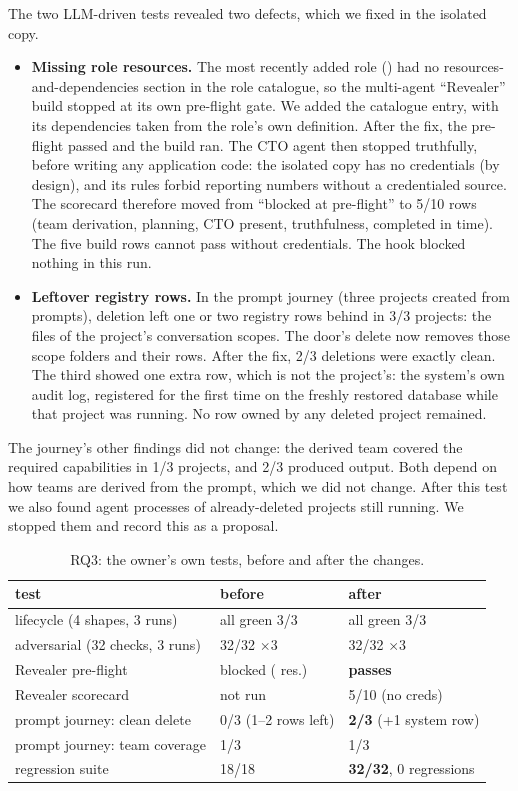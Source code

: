 The two LLM-driven tests revealed two defects, which we fixed in the isolated copy.
\begin{itemize}
\item \textbf{Missing role resources.} The most recently added role (\newrole{}) had no resources-and-dependencies section in the role catalogue, so the multi-agent ``Revealer'' build stopped at its own pre-flight gate. We added the catalogue entry, with its dependencies taken from the role's own definition. After the fix, the pre-flight passed and the build ran. The CTO agent then stopped truthfully, before writing any application code: the isolated copy has no credentials (by design), and its rules forbid reporting numbers without a credentialed source. The scorecard therefore moved from ``blocked at pre-flight'' to 5/10 rows (team derivation, planning, CTO present, truthfulness, completed in time). The five build rows cannot pass without credentials. The hook blocked nothing in this run.
\item \textbf{Leftover registry rows.} In the prompt journey (three projects created from prompts), deletion left one or two registry rows behind in 3/3 projects: the files of the project's conversation scopes. The door's delete now removes those scope folders and their rows. After the fix, 2/3 deletions were exactly clean. The third showed one extra row, which is not the project's: the system's own audit log, registered for the first time on the freshly restored database while that project was running. No row owned by any deleted project remained.
\end{itemize}
The journey's other findings did not change: the derived team covered the required capabilities in 1/3 projects, and 2/3 produced output. Both depend on how teams are derived from the prompt, which we did not change. After this test we also found agent processes of already-deleted projects still running. We stopped them and record this as a proposal.

\begin{table}[t]
\caption{RQ3: the owner's own tests, before and after the changes.}\label{tab:rq3}
\centering\scriptsize
\setlength{\tabcolsep}{3pt}
\begin{tabular}{@{}lll@{}}
\toprule
test & before & after\\
\midrule
lifecycle (4 shapes, 3 runs) & all green 3/3 & all green 3/3\\
adversarial (32 checks, 3 runs) & 32/32 $\times$3 & 32/32 $\times$3\\
Revealer pre-flight & blocked (\newrole{} res.) & \textbf{passes}\\
Revealer scorecard & not run & 5/10 (no creds)\\
prompt journey: clean delete & 0/3 (1--2 rows left) & \textbf{2/3} (+1 system row)\\
prompt journey: team coverage & 1/3 & 1/3\\
regression suite & 18/18 & \textbf{32/32}, 0 regressions\\
\bottomrule
\end{tabular}
\end{table}

